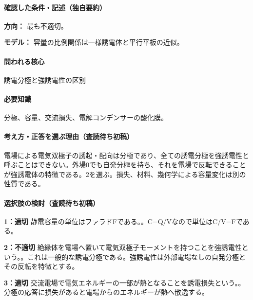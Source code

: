 \paragraph{確認した条件・記述（独自要約）}\mbox{}\par

\noindent\textbf{方向：} 最も不適切。\par

\noindent\textbf{モデル：} 容量の比例関係は一様誘電体と平行平板の近似。\par

\paragraph{問われる核心} 誘電分極と強誘電性の区別

\paragraph{必要知識} 分極、容量、交流損失、電解コンデンサーの酸化膜。

\paragraph{考え方・正答を選ぶ理由（査読待ち初稿）} 電場による電気双極子の誘起・配向は分極であり、全ての誘電分極を強誘電性と呼ぶことはできない。外場0でも自発分極を持ち、それを電場で反転できることが強誘電体の特徴である。2を選ぶ。損失、材料、幾何学による容量変化は別の性質である。

\paragraph{選択肢の検討（査読待ち初稿）}\mbox{}\par

\noindent\textbf{1：適切} 静電容量の単位はファラドFである。。C=\allowbreak{}Q/Vなので単位はC/V=\allowbreak{}Fである。\par

\noindent\textbf{2：不適切} 絶縁体を電場へ置いて電気双極子モーメントを持つことを強誘電性という。。これは一般的な誘電分極である。強誘電性は外部電場なしの自発分極とその反転を特徴とする。\par

\noindent\textbf{3：適切} 交流電場で電気エネルギーの一部が熱となることを誘電損失という。。分極の応答に損失があると電場からのエネルギーが熱へ散逸する。\par

